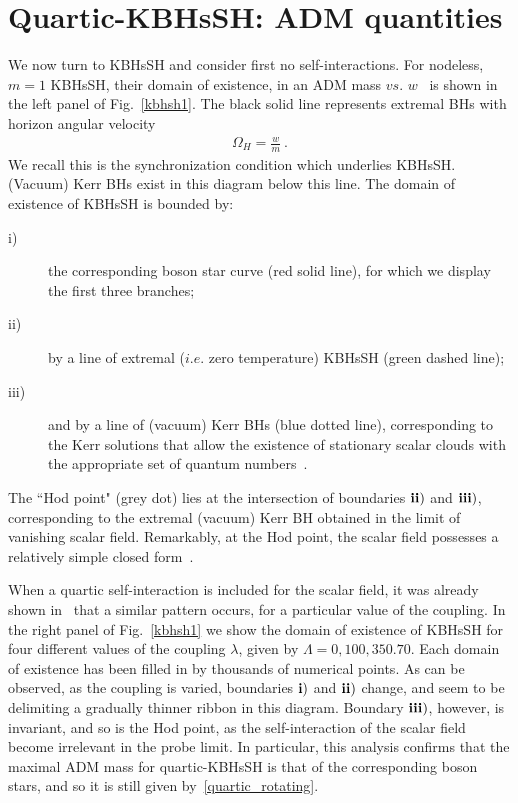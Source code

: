 \section{Quartic-KBHsSH: ADM quantities}
\label{sec_III}
We now turn to KBHsSH and consider first no self-interactions. For nodeless, $m=1$ KBHsSH, their domain of existence, in an ADM mass $vs.$ $w$~\cite{Herdeiro:2014goa,Herdeiro:2015gia} is shown in the left panel of Fig.~\ref{kbhsh1}.  The black solid line represents extremal BHs {with horizon angular velocity}
\begin{eqnarray}
\label{SIcond}
 \Omega_H=\frac{w}{m} \ .
\end{eqnarray} 
We recall this is the synchronization condition which underlies KBHsSH. (Vacuum) Kerr BHs exist in this diagram below this line. The domain of existence of KBHsSH is bounded by:
\begin{description}
\item[i)] the corresponding boson star curve (red solid line), for which we display the first three branches;
\item[ii)] by a line of extremal ($i.e.$ zero temperature) KBHsSH (green dashed line);
\item[iii)] and by a line of (vacuum) Kerr BHs (blue dotted line), corresponding to the Kerr solutions that allow the existence of stationary scalar clouds with the appropriate set of quantum numbers~\cite{Herdeiro:2014goa,Benone:2014ssa}.   
\end{description}
The ``Hod point" (grey dot) lies at the intersection of boundaries ${\bf ii)}$ and ${\bf iii)}$, corresponding to the extremal (vacuum) Kerr BH obtained in the limit of vanishing scalar field. Remarkably,  at the Hod point, the scalar field possesses a relatively simple closed form~\cite{Hod:2012px}.


When a quartic self-interaction is included for the scalar field, it was already shown in~\cite{Kleihaus:2015iea} that a similar pattern occurs, for a particular value of the coupling. In the right panel of Fig.~\ref{kbhsh1} we show the domain of existence of KBHsSH for four different values of the coupling $\lambda$, given by $\Lambda=0,100,350.70$. Each domain of existence has been filled in by thousands of numerical points. As can be observed, as the coupling is varied, boundaries  ${\bf i)}$ and ${\bf ii)}$ change, and seem to be delimiting a gradually thinner ribbon in this diagram. Boundary  ${\bf iii)}$, however, is invariant, and so is the Hod point, as the self-interaction of the scalar field become irrelevant in the probe limit. In particular, this analysis confirms that the maximal ADM mass for quartic-KBHsSH is that of the corresponding boson stars, and so it is still given by~\eqref{quartic_rotating}.




